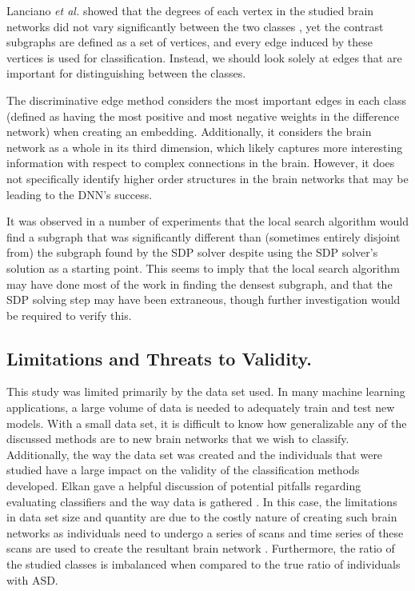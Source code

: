 \documentclass[sigconf]{acmart}
\begin{document}
Lanciano \emph{et al.} showed that the degrees of each vertex in the studied brain networks did not vary significantly between the two classes \cite{lanciano2020},
yet the contrast subgraphs are defined as a set of vertices, and every edge induced by these vertices is used for classification.
Instead, we should look solely at edges that are important for distinguishing between the classes.

The discriminative edge method considers the most important edges in each class (defined as having the most positive and most negative weights in the difference network) when creating an embedding.
Additionally, it considers the brain network as a whole in its third dimension, which likely captures more interesting information with respect to complex connections in the brain.
However, it does not specifically identify higher order structures in the brain networks that may be leading to the DNN's success.

It was observed in a number of experiments that the local search algorithm would find a subgraph that was significantly different than (sometimes entirely disjoint from) the subgraph found by the SDP solver despite using the SDP solver's solution as a starting point.
This seems to imply that the local search algorithm may have done most of the work in finding the densest subgraph, and that the SDP solving step may have been extraneous, though further investigation would be required to verify this.

\subsection{Limitations and Threats to Validity.}
This study was limited primarily by the data set used.
In many machine learning applications, a large volume of data is needed to adequately train and test new models.
With a small data set, it is difficult to know how generalizable any of the discussed methods are to new brain networks that we wish to classify.
Additionally, the way the data set was created and the individuals that were studied have a large impact on the validity of the classification methods developed.
Elkan gave a helpful discussion of potential pitfalls regarding evaluating classifiers and the way data is gathered \cite{elkan2012}.
In this case, the limitations in data set size and quantity are due to the costly nature of creating such brain networks as individuals need to undergo a series of scans and time series of these scans are used to create the resultant brain network \cite{lanciano2020}.
Furthermore, the ratio of the studied classes is imbalanced when compared to the true ratio of individuals with ASD.
\end{document}
